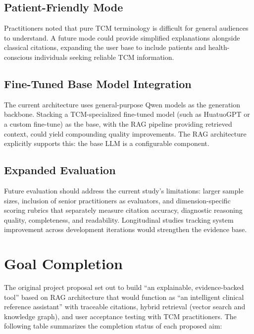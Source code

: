 \subsection{Patient-Friendly Mode}

Practitioners noted that pure TCM terminology is difficult for general audiences to understand. A future mode could provide simplified explanations alongside classical citations, expanding the user base to include patients and health-conscious individuals seeking reliable TCM information.

\subsection{Fine-Tuned Base Model Integration}

The current architecture uses general-purpose Qwen models as the generation backbone. Stacking a TCM-specialized fine-tuned model (such as HuatuoGPT or a custom fine-tune) as the base, with the RAG pipeline providing retrieved context, could yield compounding quality improvements. The RAG architecture explicitly supports this: the base LLM is a configurable component.

\subsection{Expanded Evaluation}

Future evaluation should address the current study's limitations: larger sample sizes, inclusion of senior practitioners as evaluators, and dimension-specific scoring rubrics that separately measure citation accuracy, diagnostic reasoning quality, completeness, and readability. Longitudinal studies tracking system improvement across development iterations would strengthen the evidence base.

\section{Goal Completion}

The original project proposal set out to build ``an explainable, evidence-backed tool'' based on RAG architecture that would function as ``an intelligent clinical reference assistant'' with traceable citations, hybrid retrieval (vector search and knowledge graph), and user acceptance testing with TCM practitioners. The following table summarizes the completion status of each proposed aim:

